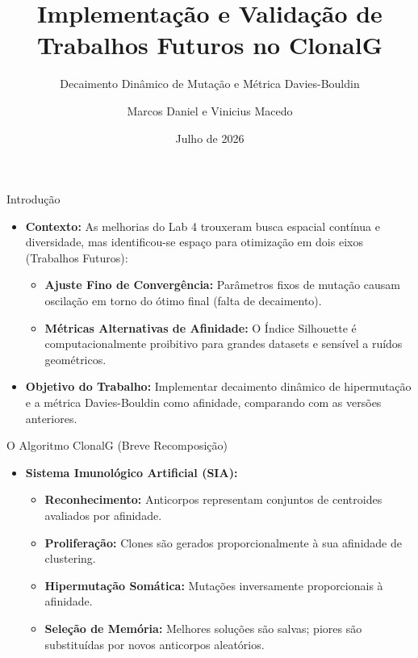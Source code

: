 \documentclass[aspectratio=169, 11pt]{beamer}
\title[Validação de Trabalhos Futuros]{Implementação e Validação de Trabalhos Futuros no ClonalG}
\subtitle{Decaimento Dinâmico de Mutação e Métrica Davies-Bouldin}
\author[Marcos e Vinicius]{Marcos Daniel e Vinicius Macedo}
\institute[IFNMG]{Instituto Federal do Norte de Minas Gerais}
\date{Julho de 2026}
\begin{document}
\begin{frame}
  \titlepage
\end{frame}

\begin{frame}{Introdução}
  \begin{itemize}
    \item \textbf{Contexto:} As melhorias do Lab 4 trouxeram busca espacial contínua e diversidade, mas identificou-se espaço para otimização em dois eixos (Trabalhos Futuros):
      \begin{itemize}
        \item \textbf{Ajuste Fino de Convergência:} Parâmetros fixos de mutação causam oscilação em torno do ótimo final (falta de decaimento).
        \item \textbf{Métricas Alternativas de Afinidade:} O Índice Silhouette é computacionalmente proibitivo para grandes datasets e sensível a ruídos geométricos.
      \end{itemize}
    \item \textbf{Objetivo do Trabalho:} Implementar decaimento dinâmico de hipermutação e a métrica Davies-Bouldin como afinidade, comparando com as versões anteriores.
  \end{itemize}
\end{frame}

\begin{frame}{O Algoritmo ClonalG (Breve Recomposição)}
  \begin{itemize}
    \item \textbf{Sistema Imunológico Artificial (SIA):}
      \begin{itemize}
        \item \textbf{Reconhecimento:} Anticorpos representam conjuntos de centroides avaliados por afinidade.
        \item \textbf{Proliferação:} Clones são gerados proporcionalmente à sua afinidade de clustering.
        \item \textbf{Hipermutação Somática:} Mutações inversamente proporcionais à afinidade.
        \item \textbf{Seleção de Memória:} Melhores soluções são salvas; piores são substituídas por novos anticorpos aleatórios.
      \end{itemize}
  \end{itemize}
\end{frame}
\end{document}
